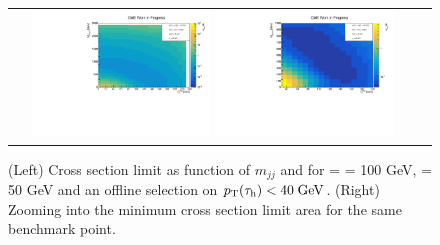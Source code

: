 \begin{figure}[tbh!]
	\centering
	\begin{tabular}{cc}
		\includegraphics[width=0.45\textwidth]{analysis/pics/JetInvMass_vs_MET_xsec_chi100_lsp050_taupt40.pdf}
		\includegraphics[width=0.45\textwidth]{analysis/pics/JetInvMass_vs_MET_xsec_chi100_lsp050_taupt40_zoom.pdf}
	\end{tabular}
	\caption{(Left) Cross section limit as function of $m_{jj}$ and \met for \charginopm = \neutralinotwo = 100 GeV, \neutralinoone = 50 GeV and an offline selection on $p_{\text{T}}(\tau_{\text{h}}) <  40\;\text{Ge}\kern-0.06667em\text{V}$. (Right) Zooming into the minimum cross section limit area for the same benchmark point.}
	\label{fig::JetInvMass_vs_MET_xsec_chi100_lsp050_taupt40}
\end{figure}

